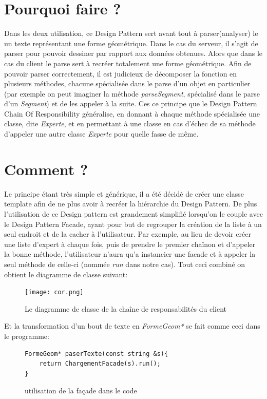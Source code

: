 \documentclass[10pt,a4paper]{report}
\begin{document}
\begin{spacing}{0.8}
\section{Pourquoi faire ?}
Dans les deux utilisation, ce Design Pattern sert avant tout à parser(analyser) le un texte représentant une forme géométrique. Dans le cas du serveur, il s'agit de parser pour pouvoir dessiner par rapport aux données obtenues. Alors que dans le cas du client le parse sert à recréer totalement une forme géométrique. Afin de pouvoir parser correctement, il est judicieux de décomposer la fonction en plusieurs méthodes, chacune spécialisée dans le parse d'un objet en particulier (par exemple on peut imaginer la méthode \textit{parseSegment}, spécialisé dans le parse d'un \textit{Segment}) et de les appeler à la suite. Ces ce principe que le Design Pattern Chain Of Responsibility généralise, en donnant à chaque méthode spécialisée une classe, dite \textit{Experte}, et en permettant à une classe en cas d'échec de sa méthode d'appeler une autre classe \textit{Experte} pour quelle fasse de même. 

\section{Comment ?}
Le principe étant très simple et générique, il a été décidé de créer une classe template afin de ne plus avoir à recréer la hiérarchie du Design Pattern. De plus l'utilisation de ce Design pattern est grandement simplifié lorsqu'on le couple avec le Design Pattern Facade, ayant pour but de regrouper la création de la liste à un seul endroit et de la cacher à l'utilisateur. Par exemple, au lieu de devoir créer une liste d'expert à chaque fois, puis de prendre le premier chaînon et d'appeler la bonne méthode, l'utilisateur n'aura qu'a instancier une facade et à appeler la seul méthode de celle-ci (nommée \textit{run} dans notre cas).
Tout ceci combiné on obtient le diagramme de classe suivant:
\begin{figure}[H]
\texttt{[image: cor.png]}
\caption{Le diagramme de classe de la chaîne de responsabilités du client}
\end{figure}
Et la transformation d'un bout de texte en \textit{FormeGeom*} se fait comme ceci dans le programme:
\begin{figure}[H]
\begin{verbatim}
FormeGeom* paserTexte(const string &s){
    return ChargementFacade(s).run();
}
\end{verbatim}
\caption{utilisation de la façade dans le code}
\end{figure}




\end{spacing}
\end{document}
